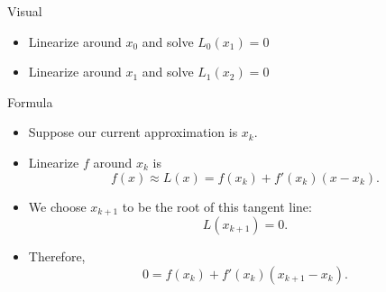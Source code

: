 \documentclass[10pt]{beamer}
\begin{document}
\begin{frame}{Visual}
\begin{center}
\end{center}



\begin{itemize}
    \item<1-> Linearize around $x_0$ and solve $L_0(x_1)=0$ 
    \item<2-> Linearize around $x_1$ and solve $L_1(x_2)=0$
\end{itemize}
\end{frame}

\begin{frame}{Formula}

\begin{itemize}
    \item  Suppose our current approximation is $x_k$.

\vfill

\item Linearize $f$ around $x_k$ is
\[
f(x)\approx L(x)=
f(x_k)+f'(x_k)(x-x_k).
\]

\vfill

\item We choose $x_{k+1}$ to be the root of this tangent line:
\[
L(x_{k+1})=0.
\]


\item<2-> Therefore,
\[
0
=
f(x_k)+f'(x_k)(x_{k+1}-x_k).
\]

\vfill

\end{itemize}

\end{frame}
\end{document}
